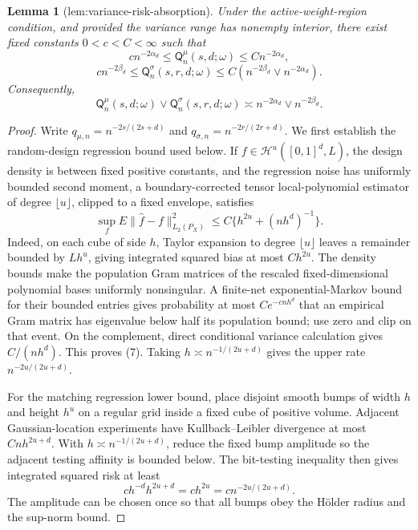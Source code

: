 \documentclass{article}
\newtheorem{lemma}{Lemma}
\begin{document}
\begin{lemma}[lem:variance-risk-absorption]\label{lem:variance-risk-absorption}
Under the active-weight-region condition, and provided the variance range has nonempty interior, there exist fixed constants \(0<c<C<\infty\) such that
\[
c n^{-2\alpha_d}\leq\mathsf Q_n^{\mu}(s,d;\omega)\leq C n^{-2\alpha_d},
\]
\[
c n^{-2\beta_d}\leq\mathsf Q_n^{\sigma}(s,r,d;\omega)
\leq C\left(n^{-2\beta_d}\vee n^{-2\alpha_d}\right).
\]
Consequently,
\[
\mathsf Q_n^{\mu}(s,d;\omega)\vee\mathsf Q_n^{\sigma}(s,r,d;\omega)
\asymp n^{-2\alpha_d}\vee n^{-2\beta_d}.
\]
\end{lemma}
\begin{proof}
Write \(q_{\mu,n}=n^{-2s/(2s+d)}\) and \(q_{\sigma,n}=n^{-2r/(2r+d)}\).  We first establish the random-design regression bound used below.  If \(f\in\mathcal H^u([0,1]^d,L)\), the design density is between fixed positive constants, and the regression noise has uniformly bounded second moment, a boundary-corrected tensor local-polynomial estimator of degree \(\lfloor u\rfloor\), clipped to a fixed envelope, satisfies
\[
\sup_f E\|\widehat f-f\|_{L_2(P_X)}^2
\leq C\{h^{2u}+(nh^d)^{-1}\}.
\tag{7}
\]
Indeed, on each cube of side \(h\), Taylor expansion to degree \(\lfloor u\rfloor\) leaves a remainder bounded by \(Lh^u\), giving integrated squared bias at most \(Ch^{2u}\).  The density bounds make the population Gram matrices of the rescaled fixed-dimensional polynomial bases uniformly nonsingular.  A finite-net exponential-Markov bound for their bounded entries gives probability at most \(Ce^{-cnh^d}\) that an empirical Gram matrix has eigenvalue below half its population bound; use zero and clip on that event.  On the complement, direct conditional variance calculation gives \(C/(nh^d)\).  This proves (7).  Taking \(h\asymp n^{-1/(2u+d)}\) gives the upper rate \(n^{-2u/(2u+d)}\).

For the matching regression lower bound, place disjoint smooth bumps of width \(h\) and height \(h^u\) on a regular grid inside a fixed cube of positive volume.  Adjacent Gaussian-location experiments have Kullback--Leibler divergence at most \(Cnh^{2u+d}\).  With \(h\asymp n^{-1/(2u+d)}\), reduce the fixed bump amplitude so the adjacent testing affinity is bounded below.  The bit-testing inequality then gives integrated squared risk at least
\[
c h^{-d}h^{2u+d}=ch^{2u}=c n^{-2u/(2u+d)}.
\tag{8}
\]
The amplitude can be chosen once so that all bumps obey the Hölder radius and the sup-norm bound.


\end{proof}
\end{document}
